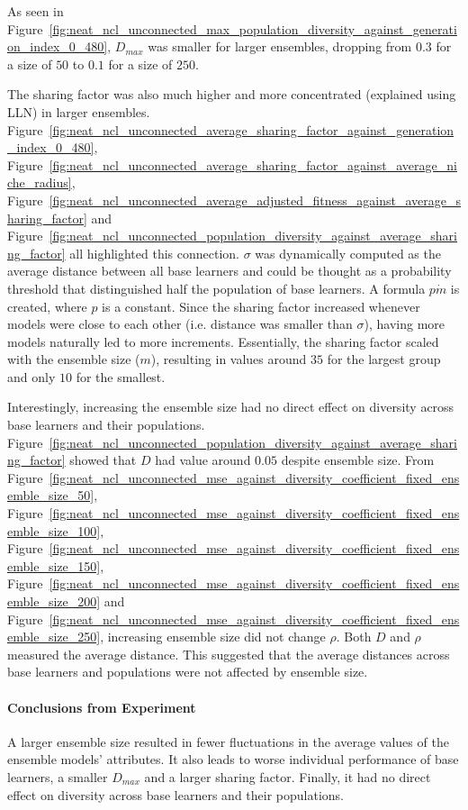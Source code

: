 \documentclass{article}
\begin{document}
As seen in Figure~\ref{fig:neat_ncl_unconnected_max_population_diversity_against_generation_index_0_480}, $D_{max}$ was smaller for larger ensembles, dropping from $0.3$ for a size of $50$ to $0.1$ for a size of $250$. 

The sharing factor was also much higher and more concentrated (explained using LLN) in larger ensembles. Figure~\ref{fig:neat_ncl_unconnected_average_sharing_factor_against_generation_index_0_480}, Figure~\ref{fig:neat_ncl_unconnected_average_sharing_factor_against_average_niche_radius}, Figure~\ref{fig:neat_ncl_unconnected_average_adjusted_fitness_against_average_sharing_factor} and Figure~\ref{fig:neat_ncl_unconnected_population_diversity_against_average_sharing_factor} all highlighted this connection. $\sigma$ was dynamically computed as the average distance between all base learners and could be thought as a probability threshold that distinguished half the population of base learners. A formula $p \dot m$ is created, where $p$ is a constant. Since the sharing factor increased whenever models were close to each other (i.e. distance was smaller than $\sigma$), having more models naturally led to more increments. Essentially, the sharing factor scaled with the ensemble size ($m$), resulting in values around $35$ for the largest group and only $10$ for the smallest. 

Interestingly, increasing the ensemble size had no direct effect on diversity across base learners and their populations. Figure~\ref{fig:neat_ncl_unconnected_population_diversity_against_average_sharing_factor} showed that $D$ had value around $0.05$ despite ensemble size. From Figure~\ref{fig:neat_ncl_unconnected_mse_against_diversity_coefficient_fixed_ensemble_size_50}, Figure~\ref{fig:neat_ncl_unconnected_mse_against_diversity_coefficient_fixed_ensemble_size_100}, Figure~\ref{fig:neat_ncl_unconnected_mse_against_diversity_coefficient_fixed_ensemble_size_150}, Figure~\ref{fig:neat_ncl_unconnected_mse_against_diversity_coefficient_fixed_ensemble_size_200} and Figure~\ref{fig:neat_ncl_unconnected_mse_against_diversity_coefficient_fixed_ensemble_size_250}, increasing ensemble size did not change $\rho$. Both $D$ and $\rho$ measured the average distance. This suggested that the average distances across base learners and populations were not affected by ensemble size. 

\paragraph{Conclusions from Experiment}
A larger ensemble size resulted in fewer fluctuations in the average values of the ensemble models' attributes. It also leads to worse individual performance of base learners, a smaller $D_{max}$ and a larger sharing factor. Finally, it had no direct effect on diversity across base learners and their populations. 
\end{document}
